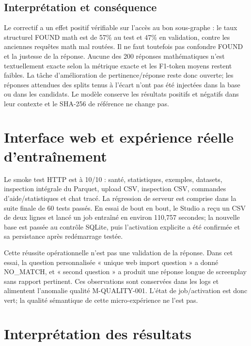 \documentclass[11pt,a4paper,openany]{book}
\begin{document}
\section{Interprétation et conséquence}
Le correctif a un effet positif vérifiable sur l'accès au bon sous-graphe : le taux structurel FOUND math est de 57\% au test et 47\% en validation, contre les anciennes requêtes math mal routées. Il ne faut toutefois pas confondre FOUND et la justesse de la réponse. Aucune des 200 réponses mathématiques n'est textuellement exacte selon la métrique exacte et les F1-token moyens restent faibles. La tâche d'amélioration de pertinence/réponse reste donc ouverte; les réponses attendues des splits tenus à l'écart n'ont pas été injectées dans la base ou dans les candidats. Le modèle conserve les résultats positifs et négatifs dans leur contexte et le SHA-256 de référence ne change pas.

\chapter{Interface web et expérience réelle d'entraînement}
Le smoke test HTTP est à 10/10 : santé, statistiques, exemples, datasets, inspection intégrale du Parquet, upload CSV, inspection CSV, commandes d'aide/statistiques et chat tracé. La régression de serveur est comprise dans la suite finale de 60 tests passés. En essai de bout en bout, le Studio a reçu un CSV de deux lignes et lancé un job entraîné en environ 110,757 secondes; la nouvelle base est passée au contrôle SQLite, puis l'activation explicite a été confirmée et sa persistance après redémarrage testée.

Cette réussite opérationnelle n'est pas une validation de la réponse. Dans cet essai, la question personnalisée « unique web import question » a donné NO\_MATCH, et « second question » a produit une réponse longue de screenplay sans rapport pertinent. Ces observations sont conservées dans les logs et alimentent l'anomalie qualité M-QUALITY-001. L'état de job/activation est donc vert; la qualité sémantique de cette micro-expérience ne l'est pas.

\chapter{Interprétation des résultats}
\end{document}
